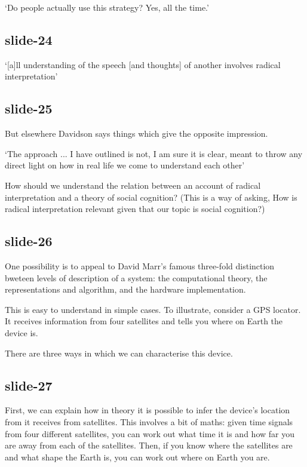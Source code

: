 \documentclass[12pt,\papersize]{extarticle}
\begin{document}
‘Do people actually use this strategy? Yes, all the time.’
\citep[p.~21]{Dennett:1987sf}

\subsection{slide-24}
‘[a]ll understanding of the speech  [and thoughts] of another involves radical interpretation’
\citep[p.~125]{Davidson:1973jx}

\subsection{slide-25}
But elsewhere Davidson says things which give the opposite impression.

‘The approach ... I have outlined is not, I am sure it is clear, meant to throw any direct light on how in real life we come to understand each other’
\citep[p.~12]{Davidson:1980xp}

How should we understand the relation between an account of radical interpretation
and a theory of social cognition?
(This is a way of asking, How is radical interpretation relevant given
that our topic is social cognition?)

\subsection{slide-26}
One possibility is to appeal to David Marr’s famous three-fold distinction
bweteen levels of description of a system: the computational theory, the
representations and algorithm, and the hardware implementation.

This is easy to understand in simple cases.
To illustrate, consider a GPS locator.
It receives information from four satellites and tells you where on Earth the device is.

There are three ways in which we can characterise this device.

\subsection{slide-27}
First, we can explain how in theory it is possible to infer the
device’s location from it receives from satellites.
This involves a bit of maths: given time signals from four different satellites,
you can work out what time it is and how far you are away from each
of the satellites.
Then, if you know where the satellites are and what shape the Earth is,
you can work out where on Earth you are.
\end{document}
